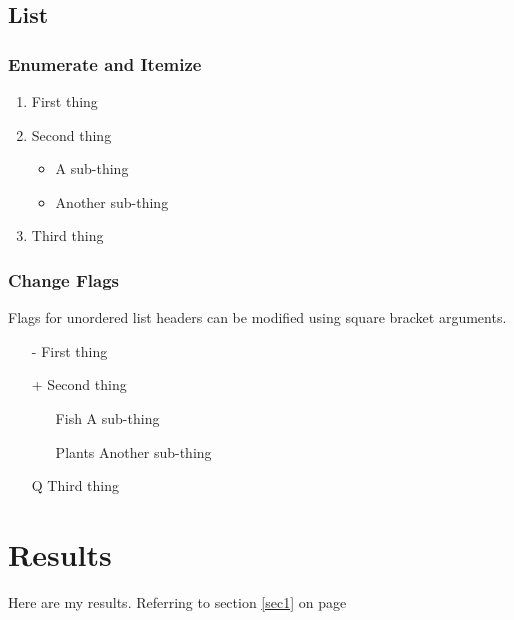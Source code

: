 \documentclass[a4paper,12pt]{article}
\begin{document}
\subsection{List}
\subsubsection{Enumerate and Itemize}
\begin{enumerate}
\item First thing
\item Second thing
\begin{itemize}
\item A sub-thing
\item Another sub-thing
\end{itemize}
\item Third thing
\end{enumerate}
\subsubsection{Change Flags}
Flags for unordered list headers can be modified using square bracket arguments.
\begin{itemize}
\item[-] First thing
\item[+] Second thing
\begin{itemize}
\item[Fish] A sub-thing
\item[Plants] Another sub-thing
\end{itemize}
\item[Q] Third thing
\end{itemize}

\section{Results}
Here are my results. Referring to section \ref{sec1} on page \pageref{sec1}
\end{document}
